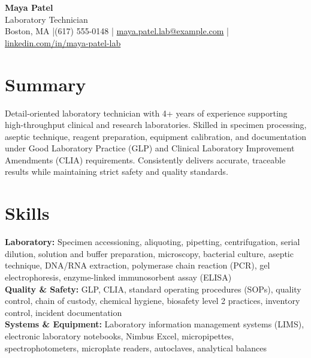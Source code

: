 \documentclass[10pt,letterpaper]{article}
\begin{document}
\begin{center}
  {\fontsize{22}{24}\selectfont\bfseries\color{heading} Maya Patel}\\[3pt]
  {\large Laboratory Technician}\\[4pt]
  Boston, MA \enspace|\enspace (617) 555-0148 \enspace|\enspace
  \href{mailto:maya.patel.lab@example.com}{maya.patel.lab@example.com} \enspace|\enspace
  \href{https://www.linkedin.com/in/maya-patel-lab}{linkedin.com/in/maya-patel-lab}
\end{center}

\section*{Summary}
Detail-oriented laboratory technician with 4+ years of experience supporting high-throughput clinical and research laboratories. Skilled in specimen processing, aseptic technique, reagent preparation, equipment calibration, and documentation under Good Laboratory Practice (GLP) and Clinical Laboratory Improvement Amendments (CLIA) requirements. Consistently delivers accurate, traceable results while maintaining strict safety and quality standards.

\section*{Skills}
\textbf{Laboratory:} Specimen accessioning, aliquoting, pipetting, centrifugation, serial dilution, solution and buffer preparation, microscopy, bacterial culture, aseptic technique, DNA/RNA extraction, polymerase chain reaction (PCR), gel electrophoresis, enzyme-linked immunosorbent assay (ELISA)\\[2pt]
\textbf{Quality \& Safety:} GLP, CLIA, standard operating procedures (SOPs), quality control, chain of custody, chemical hygiene, biosafety level 2 practices, inventory control, incident documentation\\[2pt]
\textbf{Systems \& Equipment:} Laboratory information management systems (LIMS), electronic laboratory notebooks, Nimbus Excel, micropipettes, spectrophotometers, microplate readers, autoclaves, analytical balances
\end{document}
